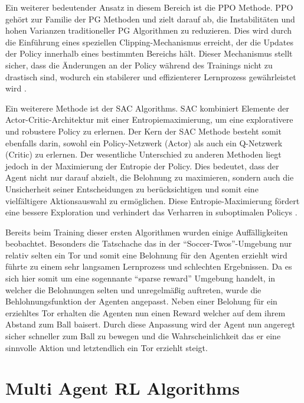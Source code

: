 Ein weiterer bedeutender Ansatz in diesem Bereich ist die \ac{PPO} Methode. \ac{PPO} gehört zur Familie der \ac{PG} Methoden und zielt darauf ab, die Instabilitäten und hohen Varianzen traditioneller \ac{PG} Algorithmen zu reduzieren. Dies wird durch die Einführung eines speziellen Clipping-Mechanismus erreicht, der die Updates der Policy innerhalb eines bestimmten Bereichs hält. Dieser Mechanismus stellt sicher, dass die Änderungen an der Policy während des Trainings nicht zu drastisch sind, wodurch ein stabilerer und effizienterer Lernprozess gewährleistet wird \cite{todo}.

Ein weiterere Methode ist der \ac{SAC} Algorithms. \ac{SAC} kombiniert Elemente der Actor-Critic-Architektur mit einer Entropiemaximierung, um eine explorativere und robustere Policy zu erlernen. Der Kern der \ac{SAC} Methode besteht somit ebenfalls darin, sowohl ein Policy-Netzwerk (Actor) als auch ein Q-Netzwerk (Critic) zu erlernen. Der wesentliche Unterschied zu anderen Methoden liegt jedoch in der Maximierung der Entropie der Policy. Dies bedeutet, dass der Agent nicht nur darauf abzielt, die Belohnung zu maximieren, sondern auch die Unsicherheit seiner Entscheidungen zu berücksichtigen und somit eine vielfältigere Aktionsauswahl zu ermöglichen. Diese Entropie-Maximierung fördert eine bessere Exploration und verhindert das Verharren in suboptimalen Policys \cite{todo}. 

Bereits beim Training dieser ersten Algorithmen wurden einige Auffälligkeiten beobachtet. Besonders die Tatschache das in der ``Soccer-Twos''-Umgebung nur relativ selten ein Tor und somit eine Belohnung für den Agenten erziehlt wird führte zu einem sehr langsamen Lernprozess und schlechten Ergebnissen. Da es sich hier somit um eine sogennante ``sparse reward'' Umgebung handelt, in welcher die Belohnungen selten und unregelmäßig auftreten, wurde die Behlohnungsfunktion der Agenten angepasst. Neben einer Belohung für ein erziehltes Tor erhalten die Agenten nun einen Reward welcher auf dem ihrem Abstand zum Ball baisert. %
Durch diese Anpassung wird der Agent nun angeregt sicher schneller zum Ball zu bewegen und die Wahrscheinlichkeit das er eine sinnvolle Aktion und letztendlich ein Tor erziehlt steigt.


\section{Multi Agent RL Algorithms}


